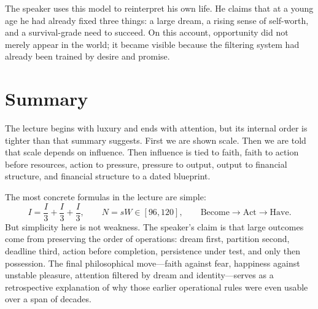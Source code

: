 The speaker uses this model to reinterpret his own life. He claims that at a young age he had already fixed three things: a large dream, a rising sense of self-worth, and a survival-grade need to succeed. On this account, opportunity did not merely appear in the world; it became visible because the filtering system had already been trained by desire and promise.

\section{Summary}

The lecture begins with luxury and ends with attention, but its internal order is tighter than that summary suggests. First we are shown scale. Then we are told that scale depends on influence. Then influence is tied to faith, faith to action before resources, action to pressure, pressure to output, output to financial structure, and financial structure to a dated blueprint.

The most concrete formulas in the lecture are simple:
\[
I = \frac{I}{3} + \frac{I}{3} + \frac{I}{3},
\qquad
N = sW \in [96,120],
\qquad
\text{Become} \to \text{Act} \to \text{Have}.
\]
But simplicity here is not weakness. The speaker's claim is that large outcomes come from preserving the order of operations: dream first, partition second, deadline third, action before completion, persistence under test, and only then possession. The final philosophical move---faith against fear, happiness against unstable pleasure, attention filtered by dream and identity---serves as a retrospective explanation of why those earlier operational rules were even usable over a span of decades.